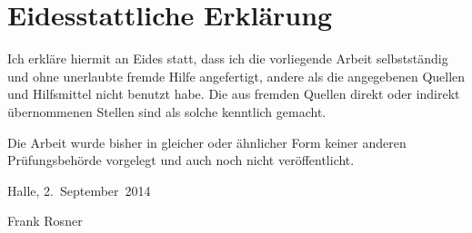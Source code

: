 \renewcommand{\baselinestretch}{1.4}\normalsize

\section*{Eidesstattliche Erklärung}

Ich erkläre hiermit an Eides statt, dass ich die vorliegende Arbeit selbstständig und ohne unerlaubte fremde Hilfe angefertigt, andere als die angegebenen Quellen und Hilfsmittel nicht benutzt habe. Die aus fremden Quellen direkt oder indirekt übernommenen Stellen sind als solche kenntlich gemacht.

Die Arbeit wurde bisher in gleicher oder ähnlicher Form keiner anderen Prüfungsbehörde vorgelegt und auch noch nicht veröffentlicht.


\vspace*{2em}
Halle, 2.~September~2014

\vspace*{2em}

Frank Rosner

\thispagestyle{empty}